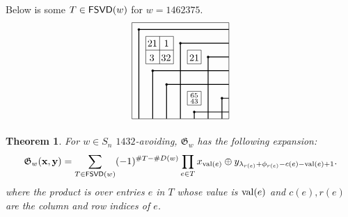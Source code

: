 \documentclass[12pt]{amsart}
\newtheorem{theorem}{Theorem}[section]
\theoremstyle{definition}
\newenvironment{example}
  {\pushQED{\qed}\renewcommand{\qedsymbol}{$\diamondsuit$}\examplex}
  {\popQED\endexamplex}
\theoremstyle{remark}
\numberwithin{equation}{section}
\newcommand{\FSVD}{{\sf FSVD}}
\newcommand{\val}{{\rm val}}
\newcommand{\Sym}{S}
\begin{document}
\begin{example}\label{ex:FSVT}
Below is some $T\in \FSVD(w)$ for $w=1462375$. 
\[
\begin{tikzpicture}[scale=.5]
\draw (0,0) rectangle (7,7);

\draw (1,6) rectangle (3,4);
\draw[line width = .1ex] (1,5) -- (3,5);
\draw[line width = .1ex] (2,4) -- (2,6);

\draw (4,4) rectangle (5,5);
\draw (4,1) rectangle (5,2);

\filldraw (0.5,6.5) circle (.5ex);
\draw[line width = .2ex] (0.5,0) -- (0.5,6.5) -- (7,6.5);
\filldraw (3.5,5.5) circle (.5ex);
\draw[line width = .2ex] (3.5,0) -- (3.5,5.5) -- (7,5.5);
\filldraw (5.5,4.5) circle (.5ex);
\draw[line width = .2ex] (5.5,0) -- (5.5,4.5) -- (7,4.5);
\filldraw (1.5,3.5) circle (.5ex);
\draw[line width = .2ex] (1.5,0) -- (1.5,3.5) -- (7,3.5);
\filldraw (2.5,2.5) circle (.5ex);
\draw[line width = .2ex] (2.5,0) -- (2.5,2.5) -- (7,2.5);
\filldraw (6.5,1.5) circle (.5ex);
\draw[line width = .2ex] (6.5,0) -- (6.5,1.5) -- (7,1.5);
\filldraw (4.5,0.5) circle (.5ex);
\draw[line width = .2ex] (4.5,0) -- (4.5,0.5) -- (7,0.5);
%
%
\put(16,75){$2 1$}
\put(33,75){$1$}

\put(18,60){$3$}
\put(30,60){$3 2$}
\put(59,60){$2 1$}


\put(60,22){$\scriptstyle{6 5}$}
\put(60,16){$\scriptstyle{4 3}$}
\end{tikzpicture}
\]
\end{example}

 

\begin{theorem}\cite[Theorem 1.1]{Fan.Guo}\label{thm:321svtGroth}
For $w\in \Sym_n$ $1432$-avoiding, $\mathfrak G_{w}$ has the following expansion:
\begin{equation}\label{equation:g321}
\mathfrak G_w(\mathbf{x},\mathbf{y})=\sum_{T\in \FSVD(w)}(-1)^{\#T-\#D(w)}\prod_{e\in T} x_{\val(e)}\oplus y_{\lambda_{r(e)}+\phi_{r(e)}-c(e)-\val(e)+1}.
\end{equation}
where the product is over entries $e$ in $T$ whose value is $\val(e)$ and $c(e),r(e)$ are the column and row indices of $e$.
\end{theorem}
\end{document}
